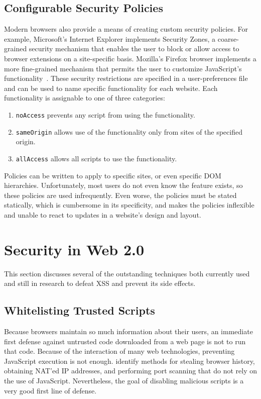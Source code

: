 \documentclass{acmtrans2m}
\begin{document}
\subsection{Configurable Security Policies}
Modern browsers also provide a means of creating custom security policies.
For example, Microsoft's Internet Explorer implements Security Zones, a coarse-grained security mechanism that enables the user to block or allow access to browser extensions on a site-specific basis.
Mozilla's Firefox browser implements a more fine-grained mechanism that permits the user to customize JavaScript's functionality~\cite{moz-config-policies}.
These security restrictions are specified in a user-preferences file and can be used to name specific functionality for each website.
Each functionality is assignable to one of three categories:
\begin{enumerate}
 \item \texttt{noAccess} prevents any script from using the functionality.
 \item \texttt{sameOrigin} allows use of the functionality only from sites of the specified origin.
 \item \texttt{allAccess} allows all scripts to use the functionality.
\end{enumerate}
Policies can be written to apply to specific sites, or even specific DOM hierarchies.
Unfortunately, most users do not even know the feature exists, so these policies are used infrequently.
Even worse, the policies must be stated statically, which is cumbersome in its specificity, and makes the policies inflexible and unable to react to updates in a website's design and layout.

\section{Security in Web 2.0}

This section discusses several of the outstanding techniques both currently used and still in research to defeat XSS and prevent its side effects.


\subsection{Whitelisting Trusted Scripts}
Because browsers maintain so much information about their users, an immediate first defense against untrusted code downloaded from a web page is not to run that code.
Because of the interaction of many web technologies, preventing JavaScript execution is not enough.
 identify methods for stealing browser history, obtaining NAT'ed IP addresses, and performing port scanning that do not rely on the use of JavaScript.
Nevertheless, the goal of disabling malicious scripts is a very good first line of defense.
\end{document}
